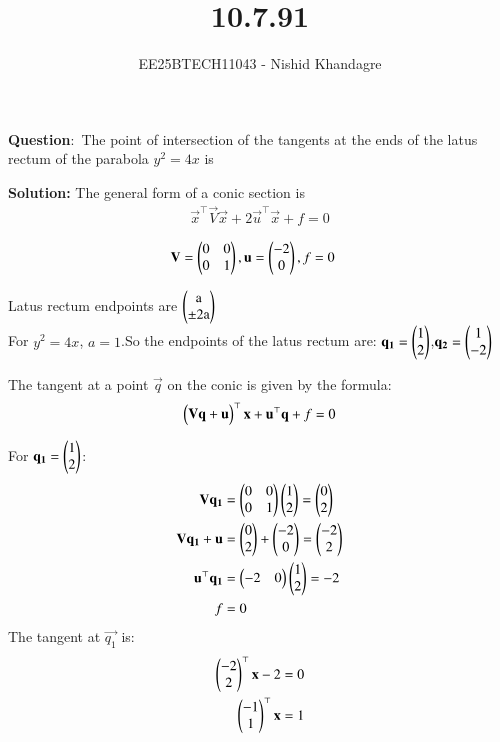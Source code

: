 \documentclass[journal]{IEEEtran}
\title{10.7.91}
\author{EE25BTECH11043 - Nishid Khandagre}
\begin{document}
\maketitle

\renewcommand{\thefigure}{\theenumi}
\renewcommand{\thetable}{\theenumi}


\textbf{Question}:\
The point of intersection of the tangents at the ends of the latus rectum of the parabola $y^2 = 4x$ is

\textbf{Solution: }
The general form of a conic section is\\
\begin{align}
\vec{x}^{\top}\vec{V}\vec{x} + 2\vec{u}^{\top}\vec{x} + f = 0
\end{align}

    \begin{align}
    \mathbf{V} &= \begin{pmatrix}0 & 0 \\ 0 & 1\end{pmatrix} , \mathbf{u}= \begin{pmatrix}-2 \\ 0\end{pmatrix} ,f= 0
    \end{align}
    
Latus rectum endpoints are $\begin{pmatrix}\text{a}\\\pm 2\text{a}\end{pmatrix}$\\
For $y^2 = 4x$, $a=1$.So the endpoints of the latus rectum are: $\mathbf{q_1} = \begin{pmatrix}1 \\ 2\end{pmatrix}$,$\mathbf{q_2} = \begin{pmatrix}1 \\ -2\end{pmatrix}$



The tangent at a point $\vec{q}$ on the conic is given by the formula:
\begin{align}
\begin{pmatrix}\mathbf{V}\mathbf{q} + \mathbf{u}\end{pmatrix}^{\top}\mathbf{x} + \mathbf{u}^{\top}\mathbf{q} + f = 0 
\end{align}

    For $\mathbf{q_1} = \begin{pmatrix}1 \\ 2\end{pmatrix}$:
    \begin{align}
    \mathbf{V}\mathbf{q_1} &= \begin{pmatrix}0 & 0 \\ 0 & 1\end{pmatrix}\begin{pmatrix}1 \\ 2\end{pmatrix} = \begin{pmatrix}0\\ 2\end{pmatrix} \\
    \mathbf{V}\mathbf{q_1} + \mathbf{u} &= \begin{pmatrix}0 \\ 2\end{pmatrix} + \begin{pmatrix}-2 \\ 0\end{pmatrix} = \begin{pmatrix}-2 \\ 2\end{pmatrix} \\
    \mathbf{u}^{\top}\mathbf{q_1} &= \begin{pmatrix}-2 & 0\end{pmatrix}\begin{pmatrix}1 \\ 2\end{pmatrix} = -2 \\
    f &= 0
    \end{align}
    The tangent at $\vec{q_1}$ is: 
    \begin{align}
    \begin{pmatrix}-2 \\ 2\end{pmatrix}^\top\mathbf{x} - 2 = 0\\
    \begin{pmatrix}-1 \\ 1\end{pmatrix}^\top\mathbf{x}=1
    \end{align}
\end{document}
